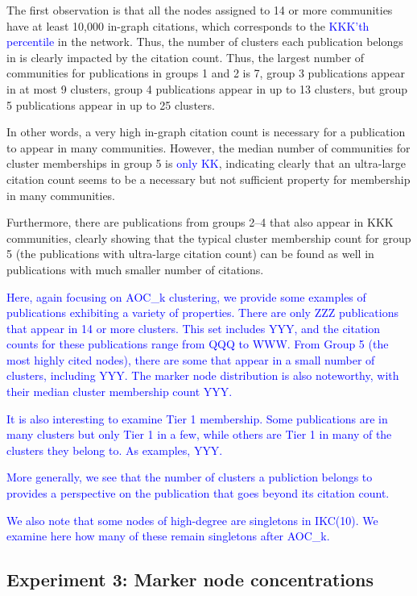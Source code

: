 \documentclass[12pt, oneside]{article}   	%
\begin{document}
The first observation is that all the nodes assigned to 14 or more communities have at least 10,000 in-graph citations, which corresponds to the \textcolor{blue}{KKK'th percentile} in the network. Thus, the number of clusters each publication belongs in is clearly impacted by the
citation count. Thus, the largest number of communities for publications in groups 1 and 2 is 7, group 3 publications appear in at most 9 clusters, group 4 publications appear in up to 13 clusters, 
but group 5 publications appear in up to 25 clusters.

In other words, a very high in-graph citation count is necessary  for a publication to appear
in many communities. However, the median number of communities for cluster memberships 
in group 5 is \textcolor{blue}{only KK}, indicating clearly that
 an ultra-large citation count seems to be a necessary but
not sufficient property for membership in many communities.

Furthermore, there are publications from groups 2--4 that also appear
in KKK communities, clearly showing that the typical cluster
membership count for group 5 (the publications with ultra-large citation
count) can be found as well in publications with much smaller number of
citations.

 


\textcolor{blue}{
Here, again focusing on AOC\_k clustering, we provide some examples
of publications exhibiting a variety of properties.
There are only ZZZ  publications that appear in 14 or more
clusters.  This set includes YYY, and the citation counts for
these publications range from QQQ to WWW.
From Group 5 (the most highly cited nodes), there are some that
appear in a small number of clusters, 
including YYY.
The marker node distribution is also noteworthy, with their
median cluster membership count YYY.
}

\textcolor{blue}{It is also interesting to examine Tier 1 membership.
Some publications are in many clusters but only Tier 1 in a few,
while others are Tier 1 in many of the clusters they belong to.
As examples, YYY.}

\textcolor{blue}{More generally, we see that the number of
clusters a publiction belongs to provides a perspective on the publication
that goes beyond its citation count.}


\textcolor{blue}{
We also note that some nodes of high-degree are singletons in IKC(10).
We examine here how many of these remain singletons after
 AOC\_k.
}

\subsection{Experiment 3: Marker node concentrations}
\end{document}
